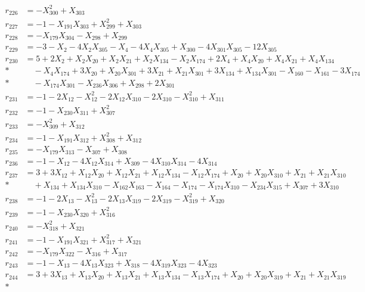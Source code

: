 \begin{align*}
r_{226} &= -X_{300}^{2} + X_{303} \\[3pt]
r_{227} &= -1 - X_{191}X_{303} + X_{299}^{2} + X_{303} \\[3pt]
r_{228} &= -X_{179}X_{304} - X_{298} + X_{299} \\[3pt]
r_{229} &= -3 - X_{2} - 4X_{2}X_{305} - X_{4} - 4X_{4}X_{305} + X_{300} - 4X_{301}X_{305} - 12X_{305} \\[3pt]
r_{230} &= 5 + 2X_{2} + X_{2}X_{20} + X_{2}X_{21} + X_{2}X_{134} - X_{2}X_{174} + 2X_{4} + X_{4}X_{20} + X_{4}X_{21} + X_{4}X_{134} \\*
&\quad  - X_{4}X_{174} + 3X_{20} + X_{20}X_{301} + 3X_{21} + X_{21}X_{301} + 3X_{134} + X_{134}X_{301} - X_{160} - X_{161} - 3X_{174} \\*
&\quad  - X_{174}X_{301} - X_{236}X_{306} + X_{298} + 2X_{301} \\[3pt]
r_{231} &= -1 - 2X_{12} - X_{12}^{2} - 2X_{12}X_{310} - 2X_{310} - X_{310}^{2} + X_{311} \\[3pt]
r_{232} &= -1 - X_{230}X_{311} + X_{307}^{2} \\[3pt]
r_{233} &= -X_{309}^{2} + X_{312} \\[3pt]
r_{234} &= -1 - X_{191}X_{312} + X_{308}^{2} + X_{312} \\[3pt]
r_{235} &= -X_{179}X_{313} - X_{307} + X_{308} \\[3pt]
r_{236} &= -1 - X_{12} - 4X_{12}X_{314} + X_{309} - 4X_{310}X_{314} - 4X_{314} \\[3pt]
r_{237} &= 3 + 3X_{12} + X_{12}X_{20} + X_{12}X_{21} + X_{12}X_{134} - X_{12}X_{174} + X_{20} + X_{20}X_{310} + X_{21} + X_{21}X_{310} \\*
&\quad  + X_{134} + X_{134}X_{310} - X_{162}X_{163} - X_{164} - X_{174} - X_{174}X_{310} - X_{234}X_{315} + X_{307} + 3X_{310} \\[3pt]
r_{238} &= -1 - 2X_{13} - X_{13}^{2} - 2X_{13}X_{319} - 2X_{319} - X_{319}^{2} + X_{320} \\[3pt]
r_{239} &= -1 - X_{230}X_{320} + X_{316}^{2} \\[3pt]
r_{240} &= -X_{318}^{2} + X_{321} \\[3pt]
r_{241} &= -1 - X_{191}X_{321} + X_{317}^{2} + X_{321} \\[3pt]
r_{242} &= -X_{179}X_{322} - X_{316} + X_{317} \\[3pt]
r_{243} &= -1 - X_{13} - 4X_{13}X_{323} + X_{318} - 4X_{319}X_{323} - 4X_{323} \\[3pt]
r_{244} &= 3 + 3X_{13} + X_{13}X_{20} + X_{13}X_{21} + X_{13}X_{134} - X_{13}X_{174} + X_{20} + X_{20}X_{319} + X_{21} + X_{21}X_{319} \\*

\end{align*}
